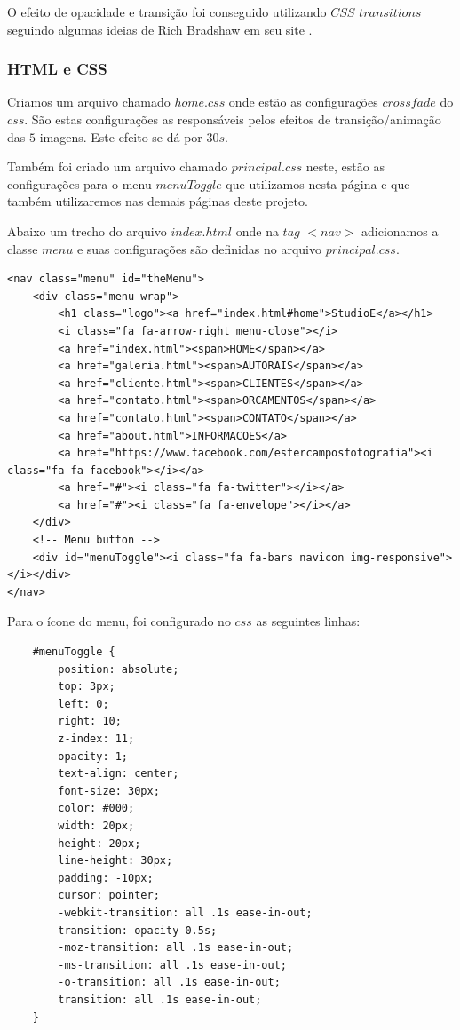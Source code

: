 	O efeito de opacidade e transição foi conseguido utilizando $CSS$ $transitions$ seguindo algumas ideias de Rich Bradshaw em seu site \cite{RichBradshaw}.

\subsubsection{HTML e CSS}	
	
	Criamos um arquivo chamado $home.css$ onde estão as configurações $crossfade$ do $css$. São estas configurações as responsáveis pelos efeitos de transição/animação das $5$ imagens. Este efeito se dá por $30s$.
	
	Também foi criado um arquivo chamado $principal.css$ neste, estão as configurações para o menu $menuToggle$ que utilizamos nesta página e que também utilizaremos nas demais páginas deste projeto.
	
	Abaixo um trecho do arquivo $index.html$ onde na $tag$ $<nav>$ adicionamos a classe $menu$ e suas configurações são definidas no arquivo $principal.css$.
	
	
	\begin{lstlisting}
<nav class="menu" id="theMenu">
	<div class="menu-wrap">
		<h1 class="logo"><a href="index.html#home">StudioE</a></h1>
		<i class="fa fa-arrow-right menu-close"></i>
		<a href="index.html"><span>HOME</span></a>
		<a href="galeria.html"><span>AUTORAIS</span></a>
		<a href="cliente.html"><span>CLIENTES</span></a>
		<a href="contato.html"><span>ORCAMENTOS</span></a>
		<a href="contato.html"><span>CONTATO</span></a>
		<a href="about.html">INFORMACOES</a>
		<a href="https://www.facebook.com/estercamposfotografia"><i class="fa fa-facebook"></i></a>
		<a href="#"><i class="fa fa-twitter"></i></a>
		<a href="#"><i class="fa fa-envelope"></i></a>
	</div>
	<!-- Menu button -->
	<div id="menuToggle"><i class="fa fa-bars navicon img-responsive"></i></div>
</nav>
\end{lstlisting}


	Para o ícone do menu, foi configurado no $css$ as seguintes linhas:
	
	\begin{lstlisting}
    #menuToggle {
        position: absolute;
        top: 3px;
        left: 0;
        right: 10;
        z-index: 11;
        opacity: 1;
        text-align: center;
        font-size: 30px;
        color: #000;
        width: 20px;
        height: 20px;
        line-height: 30px;
        padding: -10px;
        cursor: pointer;
        -webkit-transition: all .1s ease-in-out;
        transition: opacity 0.5s;
        -moz-transition: all .1s ease-in-out;
        -ms-transition: all .1s ease-in-out;
        -o-transition: all .1s ease-in-out;
        transition: all .1s ease-in-out;
    }  
\end{lstlisting}


